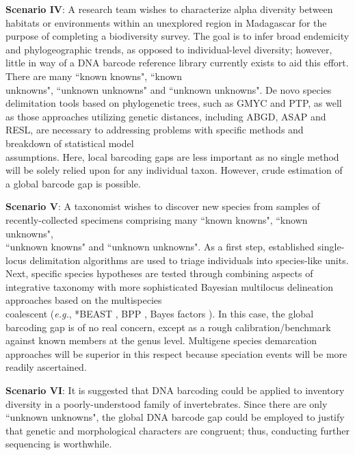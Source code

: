\textbf{Scenario IV}: A research team wishes to characterize alpha diversity between habitats or environments within an unexplored region in Madagascar for the purpose of completing a biodiversity survey. The goal is to infer broad endemicity and phylogeographic trends, as opposed to individual-level diversity; however, little in way of a DNA barcode reference library currently exists to aid this effort. There are many ``known knowns", ``known \\ unknowns", ``unknown unknowns" and ``unknown unknowns". De novo species \\ delimitation tools based on phylogenetic trees, such as GMYC and PTP, as well as those approaches utilizing genetic distances, including ABGD, ASAP and RESL, are necessary to addressing problems with specific methods and breakdown of statistical model \\ assumptions. Here, local barcoding gaps are less important as no single method will be solely relied upon for any individual taxon. However, crude estimation of a global barcode gap is possible.

  

\textbf{Scenario V}: A taxonomist wishes to discover new species from samples of \\ recently-collected specimens comprising many ``known knowns", ``known unknowns", \\ ``unknown knowns" and ``unknown unknowns". As a first step, established single-locus delimitation algorithms are used to triage individuals into species-like units. Next, specific species hypotheses are tested through combining aspects of integrative taxonomy with more sophisticated Bayesian multilocus delineation approaches based on the multispecies \\ coalescent (\textit{e.g.}, *BEAST \cite{heled2010bayesian}, BPP \cite{yang2012bayesian}, Bayes factors \cite{grummer2014species}). In this case, the global barcoding gap is of no real concern, except as a rough calibration/benchmark against known members at the genus level. Multigene species demarcation approaches will be superior in this respect because speciation events will be more readily ascertained.



\textbf{Scenario VI}: It is suggested that DNA barcoding could be applied to inventory diversity in a poorly-understood family of invertebrates. Since there are only ``unknown unknowns", the global DNA barcode gap could be employed to justify that genetic and morphological characters are congruent; thus, conducting further sequencing is worthwhile. 



